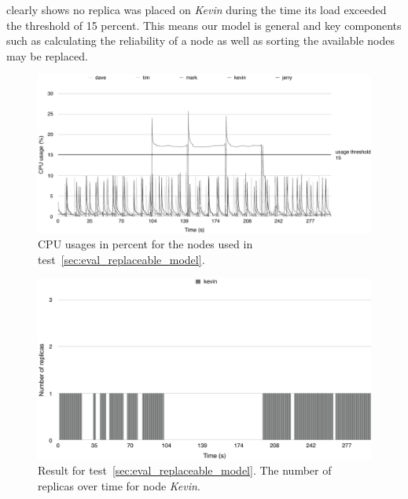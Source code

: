 \documentclass{cslthse-msc}
\begin{document}
 clearly shows no replica was placed on \emph{Kevin} during the time its load exceeded the threshold of 15 percent. This means our model is general and key components such as calculating the reliability of a node as well as sorting the available nodes may be replaced. 

\begin{figure}[!hbt]
\centering
\includegraphics[scale=0.5]{images/results/loads/usages.pdf}
\caption{CPU usages in percent for the nodes used in test~\ref{sec:eval_replaceable_model}.} \label{fig:eval_replaceable_model_usages}
\end{figure}

\begin{figure}[!hbt]
\centering
\includegraphics[scale=0.5]{images/results/loads/loaded.pdf}
\caption{Result for test~\ref{sec:eval_replaceable_model}. The number of replicas over time for node \emph{Kevin}.} \label{fig:eval_replaceable_model_loaded}
\end{figure}
\end{document}
